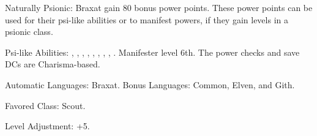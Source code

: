 \begin{itemize*}
    \item Naturally Psionic: Braxat gain 80 bonus power points. These power points can be used for their psi-like abilities or to manifest powers, if they gain levels in a psionic class. %
    \item Psi-like Abilities:
        ,
        ,
        ,
        ,
        ,
        ,
        ,
        ,
        .
    Manifester level 6th. The power checks and save DCs are Charisma-based.

    \item Automatic Languages: Braxat. Bonus Languages: Common, Elven, and Gith.
    \item Favored Class: Scout.
    \item Level Adjustment: +5.
\end{itemize*}
